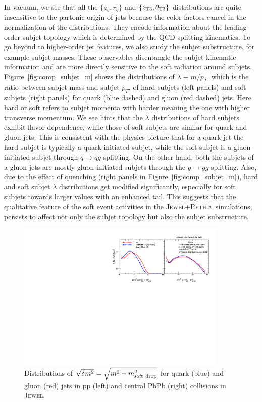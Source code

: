 \documentclass[notoc]{JHEP3}
\newcommand{\jwpy}{\textsc{Jewel+Pythia}~}
\begin{document}
In vacuum, we see that all the $\{z_g,r_g\}$ and $\{z_{\rm T3},\theta_{\rm T3}\}$ distributions are quite insensitive to the partonic origin of jets because the color factors cancel in the normalization of the distributions. They encode information about the leading-order subjet topology which is determined by the QCD splitting kinematics. To go beyond to higher-order jet features, we also study the subjet substructure, for example subjet masses. These observables disentangle the subjet kinematic information and are more directly sensitive to the soft radiation around subjets. Figure~\ref{fig:comp_subjet_m} shows the distributions of $\lambda\equiv m/p_T$, which is the ratio between subjet mass and subjet $p_T$, of hard subjets (left panels) and soft subjets (right panels) for quark (blue dashed) and gluon (red dashed) jets. Here hard or soft refers to subjet momenta with harder meaning the one with higher transverse momentum. We see hints that the $\lambda$ distributions of hard subjets exhibit flavor dependence, while those of soft subjets are similar for quark and gluon jets. This is consistent with the physics picture that for a quark jet the hard subjet is typically a quark-initiated subjet, while the soft subjet is a gluon-initiated subjet through $q\rightarrow qg$ splitting. On the other hand, both the subjets of a gluon jets are mostly gluon-initiated subjets through the $g\rightarrow gg$ splitting. Also, due to the effect of quenching (right panels in Figure~\ref{fig:comp_subjet_m}), hard and soft subjet $\lambda$ distributions get modified significantly, especially for soft subjets towards larger values with an enhanced tail. This suggests that the qualitative feature of the soft event activities in the \jwpy simulations, persists to affect not only the subjet topology but also the subjet substructure.

\begin{figure}[t]
	   \centering
	   \includegraphics[width=0.9\textwidth]{plots/Comp_delta_m2.pdf}
	   \caption{Distributions of $\sqrt{\delta m^2}=\sqrt{m^2-m^2_{\rm soft~drop}}$ for quark (blue) and gluon (red) jets in pp (left) and central PbPb (right) collisions in \textsc{Jewel}.}
\label{fig:comp_delta_m2}
\end{figure}
\end{document}
